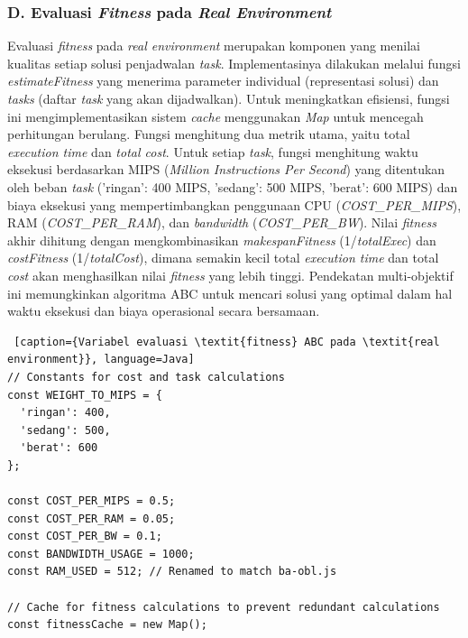 \subsubsection{D. Evaluasi \textit{Fitness} pada \textit{Real Environment}}
Evaluasi \textit{fitness} pada \textit{real environment} merupakan komponen yang menilai kualitas setiap solusi penjadwalan \textit{task}. Implementasinya dilakukan melalui fungsi \textit{estimateFitness} yang menerima parameter individual (representasi solusi) dan \textit{tasks} (daftar \textit{task} yang akan dijadwalkan). Untuk meningkatkan efisiensi, fungsi ini mengimplementasikan sistem \textit{cache} menggunakan \textit{Map} untuk mencegah perhitungan berulang. Fungsi menghitung dua metrik utama, yaitu total \textit{execution time} dan \textit{total cost}. Untuk setiap \textit{task}, fungsi menghitung waktu eksekusi berdasarkan MIPS (\textit{Million Instructions Per Second}) yang ditentukan oleh beban \textit{task} ('ringan': 400 MIPS, 'sedang': 500 MIPS, 'berat': 600 MIPS) dan biaya eksekusi yang mempertimbangkan penggunaan CPU (\textit{COST\_PER\_MIPS}), RAM (\textit{COST\_PER\_RAM}), dan \textit{bandwidth} (\textit{COST\_PER\_BW}). Nilai \textit{fitness} akhir dihitung dengan mengkombinasikan \textit{makespanFitness} (1/\textit{totalExec}) dan \textit{costFitness} (1/\textit{totalCost}), dimana semakin kecil total \textit{execution time} dan total \textit{cost} akan menghasilkan nilai \textit{fitness} yang lebih tinggi. Pendekatan multi-objektif ini memungkinkan algoritma ABC untuk mencari solusi yang optimal dalam hal waktu eksekusi dan biaya operasional secara bersamaan.

\begin{lstlisting} [caption={Variabel evaluasi \textit{fitness} ABC pada \textit{real environment}}, language=Java]
// Constants for cost and task calculations
const WEIGHT_TO_MIPS = {
  'ringan': 400,
  'sedang': 500,
  'berat': 600
};

const COST_PER_MIPS = 0.5;
const COST_PER_RAM = 0.05;
const COST_PER_BW = 0.1;
const BANDWIDTH_USAGE = 1000;
const RAM_USED = 512; // Renamed to match ba-obl.js

// Cache for fitness calculations to prevent redundant calculations
const fitnessCache = new Map();
\end{lstlisting}


